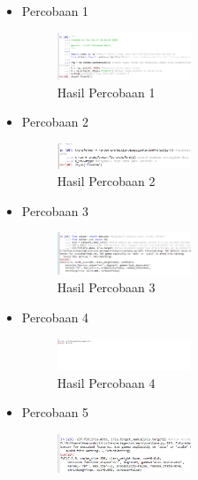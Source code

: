 \begin{itemize}
	\item Percobaan 1  \hfill \break 
	\begin{figure}[H]
		\includegraphics[width=4cm]{figures/1174035/chapter1/5_1_hasil.png}
		\centering
		\caption{Hasil Percobaan 1}
	\end{figure}
	\item Percobaan 2 \hfill \break 
	\begin{figure}[H]
		\includegraphics[width=4cm]{figures/1174035/chapter1/5_2_hasil.png}
		\centering
		\caption{Hasil Percobaan 2}
	\end{figure}
	\item Percobaan 3  \hfill \break 
	\begin{figure}[H]
		\includegraphics[width=4cm]{figures/1174035/chapter1/5_3_hasil.png}
		\centering
		\caption{Hasil Percobaan 3}
	\end{figure}
	\item Percobaan 4  \hfill \break 
	\begin{figure}[H]
		\includegraphics[width=4cm]{figures/1174035/chapter1/5_4_hasil.png}
		\centering
		\caption{Hasil Percobaan 4}
	\end{figure}
	\item Percobaan 5  \hfill \break 
	\begin{figure}[H]
		\includegraphics[width=4cm]{figures/1174035/chapter1/5_5_hasil.png}

\end{figure}
\end{itemize}
